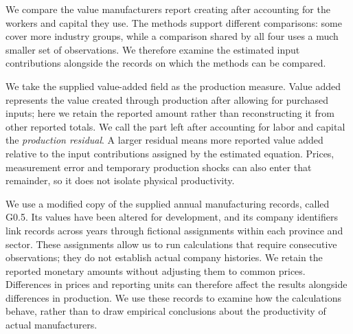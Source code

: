 \GOneBegin
{}

We compare the value manufacturers report creating after accounting for the workers and capital they use. The methods support different comparisons: some cover more industry groups, while a comparison shared by all four uses a much smaller set of observations. We therefore examine the estimated input contributions alongside the records on which the methods can be compared.

We take the supplied value-added field as the production measure. Value added represents the value created through production after allowing for purchased inputs; here we retain the reported amount rather than reconstructing it from other reported totals. We call the part left after accounting for labor and capital the \emph{production residual}. A larger residual means more reported value added relative to the input contributions assigned by the estimated equation. Prices, measurement error and temporary production shocks can also enter that remainder, so it does not isolate physical productivity.

We use a modified copy of the supplied annual manufacturing records, called G0.5. Its values have been altered for development, and its company identifiers link records across years through fictional assignments within each province and sector. These assignments allow us to run calculations that require consecutive observations; they do not establish actual company histories. We retain the reported monetary amounts without adjusting them to common prices. Differences in prices and reporting units can therefore affect the results alongside differences in production. We use these records to examine how the calculations behave, rather than to draw empirical conclusions about the productivity of actual manufacturers.

